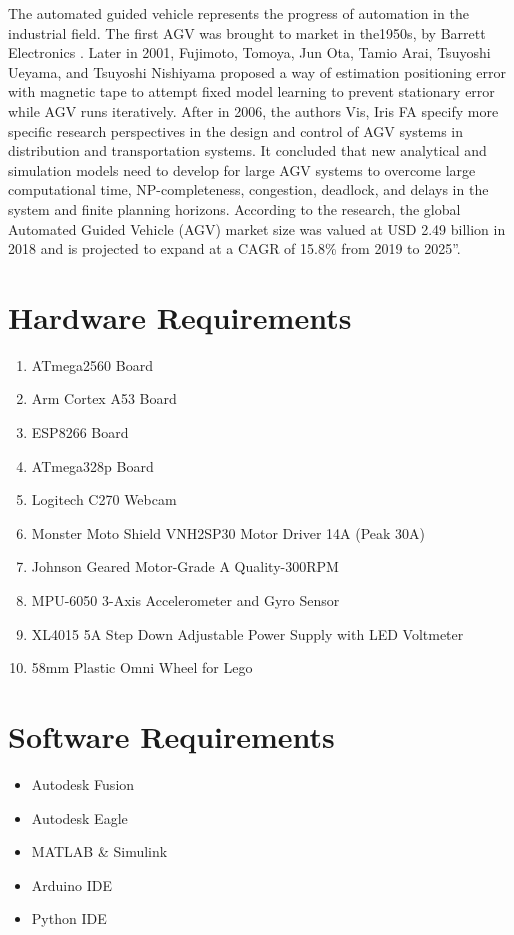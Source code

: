 \documentclass[12pt]{article}
\begin{document}
The automated guided vehicle represents the progress of automation in the industrial field. The first AGV was brought to market in the1950s, by Barrett Electronics \cite{agv_wiki}. Later in 2001, Fujimoto, Tomoya, Jun Ota, Tamio Arai, Tsuyoshi Ueyama, and Tsuyoshi Nishiyama proposed a way of estimation positioning error with magnetic tape to attempt fixed model learning to prevent stationary error while AGV runs iteratively\cite{fujimoto2001}. After in 2006, the authors Vis, Iris FA specify more specific research perspectives in the design and control of AGV systems in distribution and transportation systems. It concluded that new analytical and simulation models need to develop for large AGV systems to overcome large computational time, NP-completeness, congestion, deadlock, and delays in the system and finite planning horizons\cite{iris2006}. According to the research, the global Automated Guided Vehicle (AGV) market size was valued at USD 2.49 billion in 2018 and is projected to expand at a CAGR of 15.8\% from 2019 to 2025”\cite{grandviewresearch_site}. 

\section{Hardware Requirements}

\begin{enumerate}
    \item ATmega2560 Board
    \item Arm Cortex A53 Board
    \item ESP8266 Board
    \item ATmega328p Board
    \item Logitech C270 Webcam
    \item Monster Moto Shield VNH2SP30 Motor Driver 14A (Peak 30A)
    \item Johnson Geared Motor-Grade A Quality-300RPM
    \item MPU-6050 3-Axis Accelerometer and Gyro Sensor
    \item XL4015 5A Step Down Adjustable Power Supply with LED Voltmeter
    \item 58mm Plastic Omni Wheel for Lego
\end{enumerate}

\section{Software Requirements}

\begin{itemize}
  \item Autodesk Fusion
  \item Autodesk Eagle
  \item MATLAB \& Simulink
  \item Arduino IDE
  \item Python IDE
\end{itemize}
\end{document}
